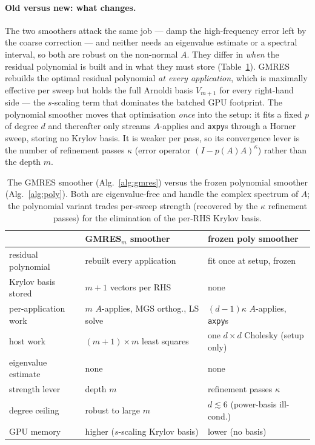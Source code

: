 \documentclass[12pt,a4paper]{article}
\newcommand{\Aop}{A}
\begin{document}
\paragraph{Old versus new: what changes.}
The two smoothers attack the same job --- damp the high-frequency error left by
the coarse correction --- and neither needs an eigenvalue estimate or a spectral
interval, so both are robust on the non-normal $\Aop$. They differ in \emph{when}
the residual polynomial is built and in what they must store
(Table~\ref{tab:smoother-compare}). GMRES rebuilds the optimal residual
polynomial \emph{at every application}, which is maximally effective per sweep but
holds the full Arnoldi basis $V_{m+1}$ for every right-hand side --- the
$s$-scaling term that dominates the batched GPU footprint. The polynomial smoother
moves that optimisation \emph{once} into the setup: it fits a fixed $p$ of degree
$d$ and thereafter only streams $\Aop$-applies and \texttt{axpy}s through a Horner
sweep, storing no Krylov basis. It is weaker per pass, so its convergence lever is
the number of refinement passes $\kappa$ (error operator $(I-p(\Aop)\Aop)^\kappa$)
rather than the depth $m$.

\begin{table}[h]
\centering
\begin{tabular}{lll}
\toprule
 & GMRES$_m$ smoother & frozen poly smoother \\
\midrule
residual polynomial   & rebuilt every application & fit once at setup, frozen \\
Krylov basis stored   & $m{+}1$ vectors per RHS & none \\
per-application work   & $m$ $\Aop$-applies, MGS orthog., LS solve & $(d{-}1)\kappa$ $\Aop$-applies, \texttt{axpy}s \\
host work             & $(m{+}1)\times m$ least squares & one $d\times d$ Cholesky (setup only) \\
eigenvalue estimate   & none & none \\
strength lever        & depth $m$ & refinement passes $\kappa$ \\
degree ceiling        & robust to large $m$ & $d\lesssim6$ (power-basis ill-cond.) \\
GPU memory            & higher ($s$-scaling Krylov basis) & lower (no basis) \\
\bottomrule
\end{tabular}
\caption{The GMRES smoother (Alg.~\ref{alg:gmres}) versus the frozen polynomial
smoother (Alg.~\ref{alg:poly}). Both are eigenvalue-free and handle the complex
spectrum of $\Aop$; the polynomial variant trades per-sweep strength (recovered by
the $\kappa$ refinement passes) for the elimination of the per-RHS Krylov basis.}
\label{tab:smoother-compare}
\end{table}
\end{document}
